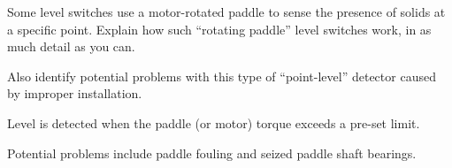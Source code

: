 

Some level switches use a motor-rotated paddle to sense the presence of solids at a specific point.  Explain how such ``rotating paddle'' level switches work, in as much detail as you can.

Also identify potential problems with this type of ``point-level'' detector caused by improper installation.







Level is detected when the paddle (or motor) torque exceeds a pre-set limit.

\vskip 10pt

Potential problems include paddle fouling and seized paddle shaft bearings.











